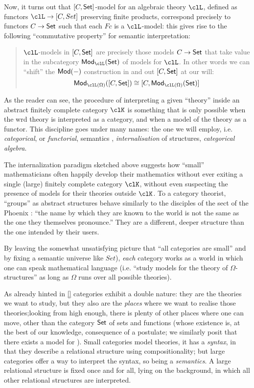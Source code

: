 Now, it turns out that $[C,\mathsf{Set}]$-model for an algebraic theory $\clL$, defined as functors $\clL \to [C,Set]$ preserving finite products, correspond precisely to functors $C\to \mathsf{Set}$ such that each $Fc$ is a $\clL$-model: this gives rise to the following ``commutative property'' for semantic interpretation:
\begin{quote}
	$\clL$-models in $[C,\mathsf{Set}]$ are precisely those models $C \to \mathsf{Set}$ that take value in the subcategory $\cate{Mod}_{\clL}(\Set)$ of models for $\clL$. In other words we can ``shift'' the $\mathsf{Mod}(-)$ construction in and out $[C,\mathsf{Set}]$ at our will:
	\[
		\cate{Mod}_{\clL(\Omega)}([C,\Set]) \cong [C, \cate{Mod}_{\clL(\Omega)}(\Set)]
	\]
\end{quote}
As the reader can see, the procedure of interpreting a given ``theory'' inside an abstract finitely complete category $\clK$ is something that is only possible when the wrd theory is interpreted as a category, and when a model of the theory as a functor. This discipline goes under many names: the one we will employ, i.e. \emph{categorical}, or \emph{functorial}, semantics \cite{lawvere1963functorial}, \emph{internalisation} of structures, \emph{categorical algebra}.

The internalization paradigm sketched above suggests how ``small'' mathematicians often happily develop their mathematics without ever exiting a single (large) finitely complete category $\clK$, without even suspecting the presence of models for their theories outside $\clK$. To a category theorist, ``groups'' as abstract structures behave similarly to the disciples of the sect of the Phoenix \cite{fenix}: ``the name by which they are known to the world
is not the same as the one they themselves pronounce.'' They are a different, deeper structure than the one intended by their users.

By leaving the somewhat unsatisfying picture that ``all categories are small'' and by fixing a semantic universe like $Set$), \emph{each} category works as a world in which one can speak mathematical language (i.e. ``study models for the theory of $\Omega$-structures'' as long as $\Omega$ runs over all possible theories).

As already hinted in \autoref{} categories exhibit a double nature: they are the theories we want to study, but they also are the \emph{places} where we want to realise those theories;looking from high enough, there is plenty of other places where one can move, other than the category $\mathsf{Set}$ of sets and functions (whose existence is, at the best of our knowledge, consequence of a postulate; we similarly posit that there exists a model for ). Small categories model theories, it has a \emph{syntax}, in that they describe a relational structure using compositionality; but large categories offer a way to interpret the syntax, so being a \emph{semantics}. A large relational structure is fixed once and for all, lying on the background, in which all other relational structures are interpreted.

